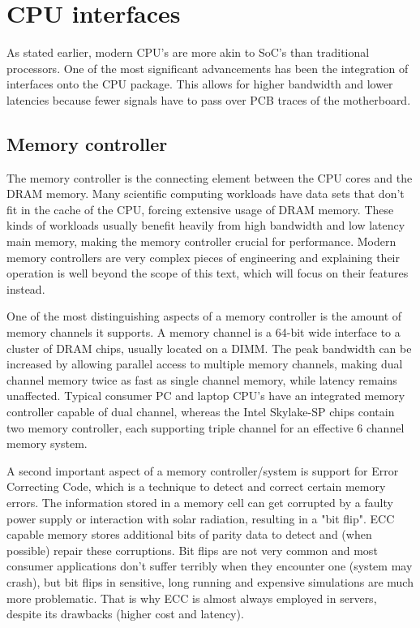 \chapter{CPU interfaces}

\hspace{4mm}As stated earlier, modern CPU's are more akin to SoC's than traditional processors. One of the most significant advancements has been the integration of interfaces onto the CPU package. This allows for higher bandwidth and lower latencies because fewer signals have to pass over PCB traces of the motherboard.

\section{Memory controller}

\hspace{4mm}The memory controller is the connecting element between the CPU cores and the DRAM memory. Many scientific computing workloads have data sets that don't fit in the cache of the CPU, forcing extensive usage of DRAM memory. These kinds of workloads usually benefit heavily from high bandwidth and low latency main memory, making the memory controller crucial for performance. Modern memory controllers are very complex pieces of engineering and explaining their operation is well beyond the scope of this text, which will focus on their features instead.\vspace{5mm}

One of the most distinguishing aspects of a memory controller is the amount of memory channels it supports\autocite[]{wiki_memch}. A memory channel is a 64-bit wide interface to a cluster of DRAM chips, usually located on a DIMM\autocite[]{wiki_dimm}. The peak bandwidth can be increased by allowing parallel access to multiple memory channels, making dual channel memory twice as fast as single channel memory, while latency remains unaffected. Typical consumer PC and laptop CPU's have an integrated memory controller capable of dual channel, whereas the Intel Skylake-SP chips contain two memory controller, each supporting triple channel for an effective 6 channel memory system.\vspace{5mm}

A second important aspect of a memory controller/system is support for Error Correcting Code, which is a technique to detect and correct certain memory errors\autocite[]{wiki_ecc}. The information stored in a memory cell can get corrupted by a faulty power supply or interaction with solar radiation, resulting in a "bit flip". ECC capable memory stores additional bits of parity data to detect and (when possible) repair these corruptions. Bit flips are not very common and most consumer applications don't suffer terribly when they encounter one (system may crash), but bit flips in sensitive, long running and expensive simulations are much more problematic. That is why ECC is almost always employed in servers, despite its drawbacks (higher cost and latency).

